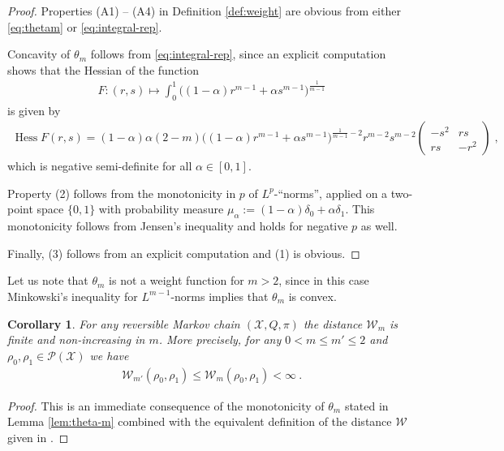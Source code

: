 \documentclass[a4paper,11pt,reqno]{amsart}
\theoremstyle{plain}
\newtheorem{corollary}[theorem]{Corollary}
\theoremstyle{remark}
\numberwithin{equation}{section}
\begin{document}
\begin{proof}
  Properties (A1) -- (A4) in Definition \ref{def:weight} are obvious
  from either \eqref{eq:thetam} or \eqref{eq:integral-rep}.

  Concavity of $\theta_m$ follows from \eqref{eq:integral-rep}, since
  an explicit computation shows that the Hessian of the function
\begin{align*}
F : (r,s) \mapsto
   \int_0^1 \Big( (1-\alpha) r^{m-1} + \alpha s^{m-1} \Big)^{\frac{1}{m-1}}
\end{align*}
is given by
\begin{align*}
 \operatorname{Hess} F(r,s) =(1-\alpha) \alpha (2-m) 
     \Big( (1-\alpha) r^{m-1} + \alpha s^{m-1} \Big)^{\frac{1}{m-1}-2}
     r^{m-2} s^{m-2}
\left(\begin{array}{cc}-s^2 & rs \\rs & -r^2\end{array}\right)\;,
\end{align*}
which is negative semi-definite for all $\alpha \in [0,1]$.

Property (2) follows from the monotonicity in $p$ of $L^p$-``norms'',
applied on a two-point space $\{0,1\}$ with probability measure
$\mu_\alpha := (1-\alpha)\delta_0 + \alpha \delta_1$. This
monotonicity follows from Jensen's inequality and holds for negative
$p$ as well.

Finally, (3) follows from an explicit computation and (1) is obvious.
\end{proof}

Let us note that $\theta_m$ is not a weight function for $m > 2$,
since in this case Minkowski's inequality for $L^{m-1}$-norms implies
that $\theta_m$ is convex.

\begin{corollary}\label{cor:finite-distance}
  For any reversible Markov chain $({\mathcal{X}}, Q, \pi)$ 
  the distance ${\mathcal{W}}_m$ is finite and non-increasing in
  $m$. More precisely, for any $0 < m \leq m'\leq 2$ and $\rho_0,\rho_1\in{{\mathscr{P}}({\mathcal{X}})}$ we
  have 
  \begin{align*}
    {\mathcal{W}}_{m'}(\rho_0,\rho_1) \leq {\mathcal{W}}_{m}(\rho_0,\rho_1) < \infty\ .
  \end{align*}
\end{corollary}

\begin{proof}
  This is an immediate consequence of the monotonicity of $\theta_m$ stated in
  Lemma \ref{lem:theta-m} combined with the equivalent definition of the
  distance ${\mathcal{W}}$ given in \cite[Lemma 2.9]{EM11}.
\end{proof}
\end{document}
